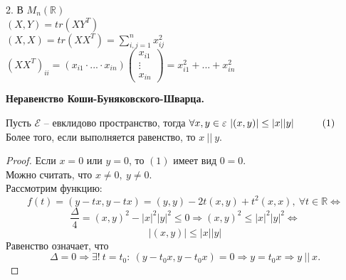 \documentclass[a4paper, 12pt]{article}
\newcommand\tab[1][.5cm]{\hspace*{#1}}
\theoremstyle{definition}
\begin{document}
    2. В $M_n(\mathbb{R})$\\
    $(X,Y) = tr(XY^T)$\\$(X,X) = tr(XX^T) = \sum\limits_{i,j=1}^
    {n} x_{ij}^2$\\
    $(XX^T)_{ii} = (x_{i1}\cdot...\cdot x_{in})\begin{pmatrix}
        x_{i1}\\\vdots\\x_{in}
    \end{pmatrix} = x_{i1}^2 +...+ x_{in}^2$
    \begin{center}
        \textbf{Неравенство Коши-Буняковского-Шварца.} 
    \end{center}
    Пусть $\mathcal{E}$ -- евклидово пространство, тогда
    $\forall x,y \in \varepsilon\ |(x,y)| \leq |x||y|\tab[1cm]
    (1)$\\  
    Более того, если выполняется равенство, то $x\ ||\ y$.
    \begin{proof}
        Если $x = 0 \text{ или } y = 0$, то $(1)$ имеет вид 
        $0 = 0$.\\
        Можно считать, что $x \neq 0,\ y \neq 0$.\\
        Рассмотрим функцию:
        $$f(t) = (y - tx, y - tx) = (y,y) - 2t(x,y) + t^2(x,x),
        \ \forall t \in \mathbb{R} \Longleftrightarrow  $$
        $$\frac{\Delta}{4} = (x,y)^2  - |x|^2|y|^2 \leq 0
        \Longrightarrow (x,y)^2 \leq |x|^2|y|^2 
        \Longleftrightarrow $$
        $$|(x,y)| \leq |x||y|$$
        Равенство означает, что $$\Delta = 0 \Longrightarrow 
        \exists !\ t = t_0:\ (y - t_0x, y - t_0x) = 0
        \Longrightarrow y = t_0x \Longrightarrow y\ ||\ x.$$ 
    \end{proof}
    
\end{document}
